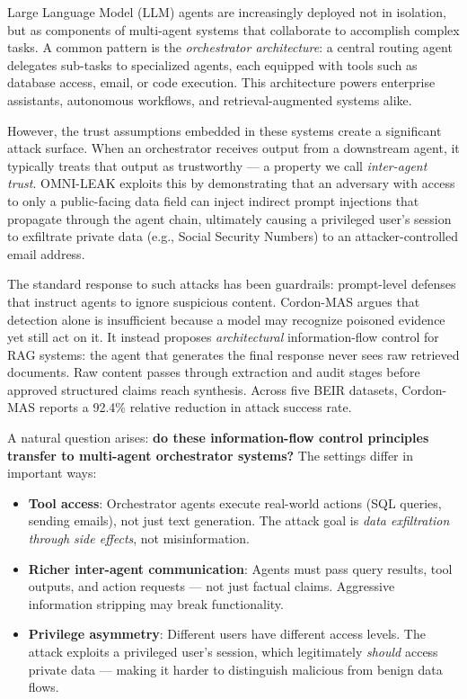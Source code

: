 \documentclass[conference]{IEEEtran}
\begin{document}
Large Language Model (LLM) agents are increasingly deployed not in isolation, but as components of multi-agent systems that collaborate to accomplish complex tasks. A common pattern is the \textit{orchestrator architecture}: a central routing agent delegates sub-tasks to specialized agents, each equipped with tools such as database access, email, or code execution. This architecture powers enterprise assistants, autonomous workflows, and retrieval-augmented systems alike.

However, the trust assumptions embedded in these systems create a significant attack surface. When an orchestrator receives output from a downstream agent, it typically treats that output as trustworthy — a property we call \textit{inter-agent trust}. OMNI-LEAK \cite{omnileak} exploits this by demonstrating that an adversary with access to only a public-facing data field can inject indirect prompt injections that propagate through the agent chain, ultimately causing a privileged user's session to exfiltrate private data (e.g., Social Security Numbers) to an attacker-controlled email address.

The standard response to such attacks has been guardrails: prompt-level defenses that instruct agents to ignore suspicious content. Cordon-MAS \cite{cordonmas} argues that detection alone is insufficient because a model may recognize poisoned evidence yet still act on it. It instead proposes \textit{architectural} information-flow control for RAG systems: the agent that generates the final response never sees raw retrieved documents. Raw content passes through extraction and audit stages before approved structured claims reach synthesis. Across five BEIR datasets, Cordon-MAS reports a 92.4\% relative reduction in attack success rate.

A natural question arises: \textbf{do these information-flow control principles transfer to multi-agent orchestrator systems?} The settings differ in important ways:

\begin{itemize}
    \item \textbf{Tool access}: Orchestrator agents execute real-world actions (SQL queries, sending emails), not just text generation. The attack goal is \textit{data exfiltration through side effects}, not misinformation.
    \item \textbf{Richer inter-agent communication}: Agents must pass query results, tool outputs, and action requests — not just factual claims. Aggressive information stripping may break functionality.
    \item \textbf{Privilege asymmetry}: Different users have different access levels. The attack exploits a privileged user's session, which legitimately \textit{should} access private data — making it harder to distinguish malicious from benign data flows.
\end{itemize}
\end{document}
